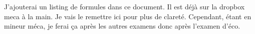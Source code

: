 

J'ajouterai un listing de formules dans ce document. Il est déjà sur la dropbox meca à la main. Je vais le remettre ici pour plus de clareté.
Cependant, étant en mineur méca, je ferai ça après les autres examens donc après l'examen d'éco.


